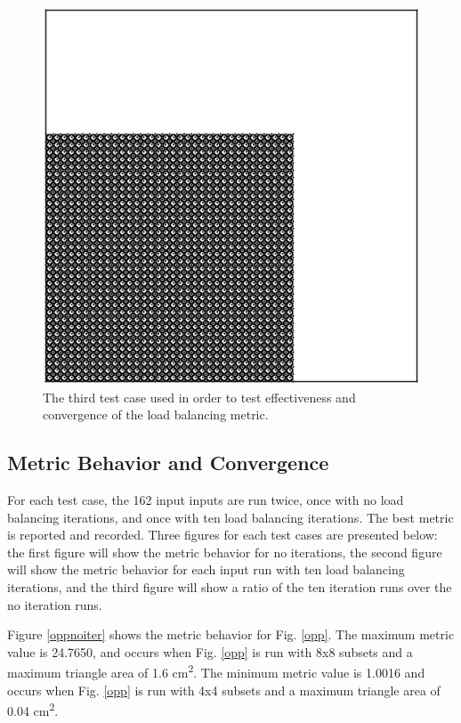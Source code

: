 \documentclass{anstrans}
\begin{document}
\begin{figure}
\centering
\includegraphics[scale = 0.5]{figures/lattice-12-shifted.eps}
\caption{The third test case used in order to test effectiveness and convergence of the load balancing metric.}
\label{lattice}
\end{figure}

\subsection{Metric Behavior and Convergence}

For each test case, the 162 input inputs are run twice, once with no load balancing iterations, and once with ten load balancing iterations. The best metric is reported and recorded. Three figures for each test cases are presented below: the first figure will show the metric behavior for no iterations, the second figure will show the metric behavior for each input run with ten load balancing iterations, and the third figure will show a ratio of the ten iteration runs over the no iteration runs.

Figure \ref{oppnoiter} shows the metric behavior for Fig. \ref{opp}. The maximum metric value is 24.7650, and occurs when Fig. \ref{opp} is run with 8x8 subsets and a maximum triangle area of 1.6 cm\textsuperscript{2}. The minimum metric value is 1.0016 and occurs when Fig. \ref{opp} is run with 4x4 subsets and a maximum triangle area of 0.04 cm\textsuperscript{2}. 
\end{document}
